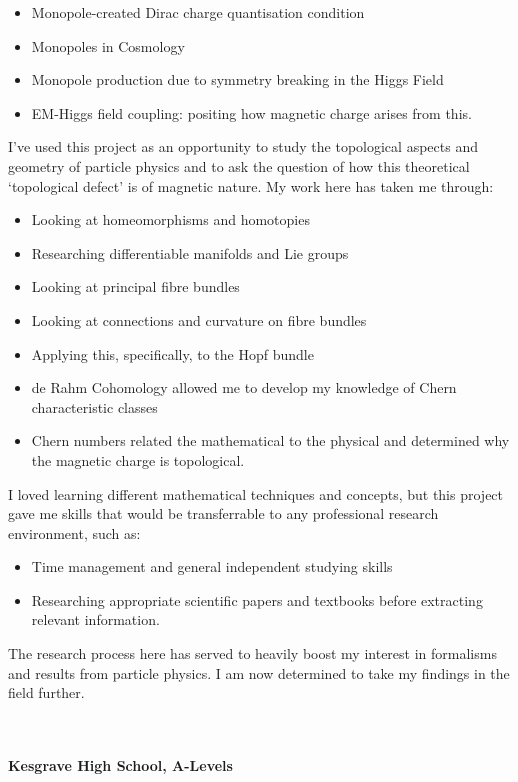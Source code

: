 \documentclass[10pt]{article}
\begin{document}
{{\begin{itemize}[itemsep=0mm, parsep=0pt]
\item Monopole-created Dirac charge quantisation condition
\item Monopoles in Cosmology
\item Monopole production due to symmetry breaking in the Higgs Field
\item EM-Higgs field coupling: positing how magnetic charge arises from this. 
\end{itemize}
I've used this project as an opportunity to study the topological aspects and geometry of particle physics and to ask the question of how this theoretical `topological defect' is of magnetic nature. My work here has taken me through:
\begin{itemize}[itemsep=0mm, parsep=0pt]
\item Looking at homeomorphisms and homotopies
\item Researching differentiable manifolds and Lie groups
\item Looking at principal fibre bundles
\item Looking at connections and curvature on fibre bundles
\item Applying this, specifically, to the Hopf bundle
\item de Rahm Cohomology allowed me to develop my knowledge of Chern characteristic classes
\item Chern numbers related the mathematical to the physical and determined why the magnetic charge is topological. 
\end{itemize}
I loved learning different mathematical techniques and concepts, but this project gave me skills that would be transferrable to any professional research environment, such as:
\begin{itemize}[itemsep=0mm, parsep=0pt]
\item Time management and general independent studying skills
\item Researching appropriate scientific papers and textbooks before extracting relevant information.
\end{itemize}
The research process here has served to heavily boost my interest in formalisms and results from particle physics. I am now determined to take my findings in the field further.}\\
\vspace{0cm}\\
 \hspace{75pt} \bfseries{Kesgrave High School, A-Levels} \hspace{167pt}\\
}
\end{document}
